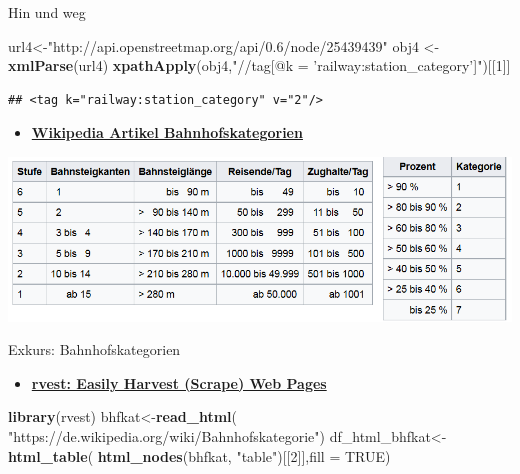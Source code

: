 \documentclass[ignorenonframetext,]{beamer}
\newenvironment{Shaded}{\begin{snugshade}}{\end{snugshade}}
\newcommand{\DataTypeTok}[1]{\textcolor[rgb]{0.13,0.29,0.53}{#1}}
\newcommand{\DecValTok}[1]{\textcolor[rgb]{0.00,0.00,0.81}{#1}}
\newcommand{\KeywordTok}[1]{\textcolor[rgb]{0.13,0.29,0.53}{\textbf{#1}}}
\newcommand{\NormalTok}[1]{#1}
\newcommand{\OtherTok}[1]{\textcolor[rgb]{0.56,0.35,0.01}{#1}}
\newcommand{\StringTok}[1]{\textcolor[rgb]{0.31,0.60,0.02}{#1}}
\providecommand{\tightlist}{%
  \setlength{\itemsep}{0pt}\setlength{\parskip}{0pt}}
\begin{document}
\begin{frame}[fragile]{Hin und weg}
\protect\hypertarget{hin-und-weg}{}

\begin{Shaded}
\begin{Highlighting}[]
\NormalTok{url4<-}\StringTok{"http://api.openstreetmap.org/api/0.6/node/25439439"}
\NormalTok{obj4 <-}\StringTok{ }\KeywordTok{xmlParse}\NormalTok{(url4)}
\KeywordTok{xpathApply}\NormalTok{(obj4,}\StringTok{"//tag[@k = 'railway:station_category']"}\NormalTok{)[[}\DecValTok{1}\NormalTok{]]}
\end{Highlighting}
\end{Shaded}

\begin{verbatim}
## <tag k="railway:station_category" v="2"/>
\end{verbatim}

\begin{itemize}
\tightlist
\item
  \href{https://de.wikipedia.org/wiki/Bahnhofskategorie}{\textbf{Wikipedia
  Artikel Bahnhofskategorien}}
\end{itemize}

\includegraphics{figure/Bahnhofskategorien.PNG}

\end{frame}

\begin{frame}[fragile]{Exkurs: Bahnhofskategorien}
\protect\hypertarget{exkurs-bahnhofskategorien}{}

\begin{itemize}
\tightlist
\item
  \href{https://cran.r-project.org/web/packages/rvest/index.html}{\textbf{rvest:
  Easily Harvest (Scrape) Web Pages}}
\end{itemize}

\begin{Shaded}
\begin{Highlighting}[]
\KeywordTok{library}\NormalTok{(rvest)}
\NormalTok{bhfkat<-}\KeywordTok{read_html}\NormalTok{(}
  \StringTok{"https://de.wikipedia.org/wiki/Bahnhofskategorie"}\NormalTok{)}
\NormalTok{df_html_bhfkat<-}\KeywordTok{html_table}\NormalTok{(}
  \KeywordTok{html_nodes}\NormalTok{(bhfkat, }\StringTok{"table"}\NormalTok{)[[}\DecValTok{2}\NormalTok{]],}\DataTypeTok{fill =} \OtherTok{TRUE}\NormalTok{)}
\end{Highlighting}
\end{Shaded}

\end{frame}
\end{document}
